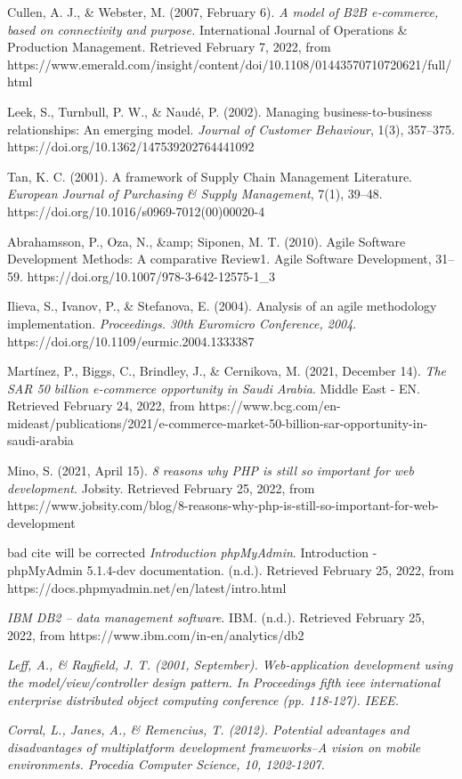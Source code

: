 \documentclass[11pt]{article}
\begin{document}
\begin{thebibliography}{9}
Cullen, A. J., \& Webster, M. (2007, February 6). \emph{A model of B2B e‐commerce, based on connectivity and purpose.} International Journal of Operations \& Production Management. Retrieved February 7, 2022, from https://www.emerald.com/insight/content/doi/10.1108/01443570710720621/full/html 

Leek, S., Turnbull, P. W., \& Naudé, P. (2002). Managing business-to-business relationships: An emerging model. \emph{Journal of Customer Behaviour}, 1(3), 357–375. https://doi.org/10.1362/147539202764441092 

Tan, K. C. (2001). A framework of Supply Chain Management Literature. \emph{European Journal of Purchasing \& Supply Management}, 7(1), 39–48. https://doi.org/10.1016/s0969-7012(00)00020-4

Abrahamsson, P., Oza, N., \&amp; Siponen, M. T. (2010). Agile Software Development Methods: A comparative Review1. Agile Software Development, 31–59. https://doi.org/10.1007/978-3-642-12575-1\_3


Ilieva, S., Ivanov, P., \& Stefanova, E. (2004). Analysis of an agile methodology implementation. \emph{Proceedings. 30th Euromicro Conference, 2004}. https://doi.org/10.1109/eurmic.2004.1333387 
 
 
Martínez, P., Biggs, C., Brindley, J., \& Cernikova, M. (2021, December 14). \emph{The SAR 50 billion e-commerce opportunity in Saudi Arabia}. Middle East - EN. Retrieved February 24, 2022, from https://www.bcg.com/en-mideast/publications/2021/e-commerce-market-50-billion-sar-opportunity-in-saudi-arabia 

Mino, S. (2021, April 15). \emph{8 reasons why PHP is still so important for web development.} Jobsity. Retrieved February 25, 2022, from https://www.jobsity.com/blog/8-reasons-why-php-is-still-so-important-for-web-development 

bad cite will be corrected
\emph{Introduction phpMyAdmin}. Introduction - phpMyAdmin 5.1.4-dev documentation. (n.d.). Retrieved February 25, 2022, from    https://docs.phpmyadmin.net/en/latest/intro.html  

\emph{IBM DB2 – data management software}. IBM. (n.d.). Retrieved February 25, 2022, from https://www.ibm.com/in-en/analytics/db2 

\emph{Leff, A., \& Rayfield, J. T. (2001, September). Web-application development using the model/view/controller design pattern. In Proceedings fifth ieee international enterprise distributed object computing conference (pp. 118-127). IEEE.
}

\emph{Corral, L., Janes, A., \& Remencius, T. (2012). Potential advantages and disadvantages of multiplatform development frameworks–A vision on mobile environments. Procedia Computer Science, 10, 1202-1207.}
\end{thebibliography}
\end{document}
